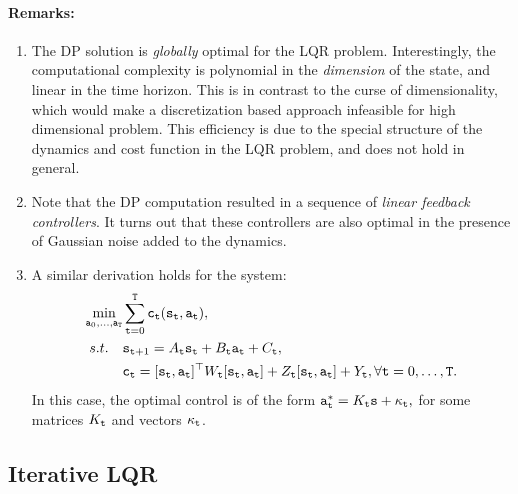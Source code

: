 \paragraph{Remarks:}
\begin{enumerate}
  \item The DP solution is \emph{globally} optimal for the LQR problem. Interestingly, the computational complexity is polynomial in the \textit{dimension} of the state, and linear in the time horizon. This is in contrast to the curse of dimensionality, which would make a discretization based approach infeasible for high dimensional problem. This efficiency is due to the special structure of the dynamics and cost function in the LQR problem, and does not hold in general.
  \item Note that the DP computation resulted in a sequence of \textit{linear feedback controllers}. It turns out that these controllers are also optimal in the presence of Gaussian noise added to the dynamics.
  \item A similar derivation holds for the system:
  \begin{equation*}\label{eq:lqr_full}
    \begin{split}
        \min_{{\tt a}_0,\dots,{\tt a}_{{\tt T}}} & \sum_{{\tt t}=0}^{\tt T} {\tt c}_{\tt t}({\tt s}_{\tt t}, {\tt a}_{\tt t}), \\
        s.t. \quad & {{\tt s}_{{\tt t}+1}} = A_{\tt t} {\tt s}_{\tt t} + B_{\tt t} {\tt a}_{\tt t} + C_{\tt t}, \\
        & {\tt c}_{\tt t} = [{\tt s}_{\tt t}, {\tt a}_{\tt t}]^\top W_{\tt t} [{\tt s}_{\tt t}, {\tt a}_{\tt t}] + Z_{\tt t} [{\tt s}_{\tt t}, {\tt a}_{\tt t}] + Y_{\tt t}, \forall {\tt t}=0,\dots,{\tt T}.
    \end{split}
\end{equation*}
In this case, the optimal control is of the form 
${\tt a}_{\tt t}^* = K_{\tt t} {\tt s} + \kappa_{\tt t}, $ for some matrices $K_{\tt t}$ and vectors  $\kappa_{\tt t}$.
\end{enumerate}


\subsection{Iterative LQR}

